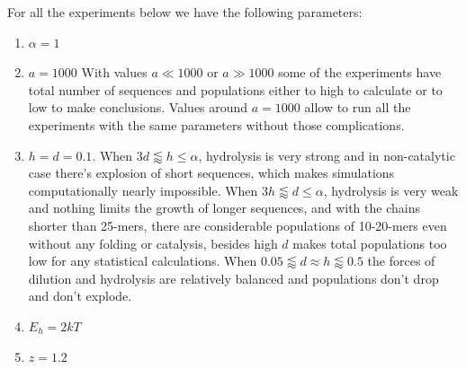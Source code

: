\documentclass[journal=jacsat,manuscript=article,layout=twocolumn]{achemso}
\newcommand*{\ga}{\alpha}
\begin{document}
For all the experiments below we have the following parameters:
\begin{enumerate}
 \item $\ga = 1$
 \item $a=1000$
 \subitem With values $a\ll 1000\,\,\mbox{or}\,\,a\gg1000$ some of the experiments have total 
number of sequences and populations either to high to calculate or to low to make conclusions. 
Values around $a=1000$ allow to run all the experiments with the same parameters without those 
complications.
 \item $h=d=0.1$.
 \subitem When $3d\lessapprox h\leq\ga$, hydrolysis is very strong and in 
non-catalytic case there's explosion of short sequences, which makes simulations computationally 
nearly impossible. 
\subitem When $3h\lessapprox d\leq\ga$, hydrolysis is very weak and nothing limits the 
growth of longer sequences, and with the chains shorter than 25-mers, there are considerable 
populations of 10-20-mers even without any folding or catalysis, besides high $d$ makes total 
populations too low for any statistical calculations. 
\subitem When $0.05\lessapprox d\approx h \lessapprox 0.5$ the forces of dilution and hydrolysis 
are relatively balanced and populations don't drop and don't explode.
 \item $E_h = 2kT$
 \item $z=1.2$
\end{enumerate}
\end{document}
